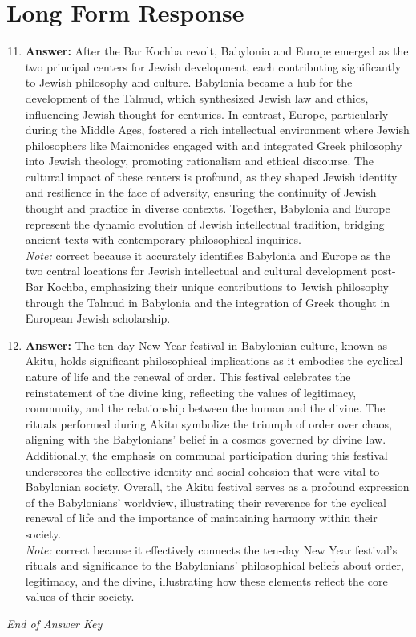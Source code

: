 \documentclass[12pt]{article}
\begin{document}
\section*{Long Form Response}
\begin{enumerate}[label=\arabic*.]
\setcounter{enumi}{10}
\item \textbf{Answer:} After the Bar Kochba revolt, Babylonia and Europe emerged as the two principal centers for Jewish development, each contributing significantly to Jewish philosophy and culture. Babylonia became a hub for the development of the Talmud, which synthesized Jewish law and ethics, influencing Jewish thought for centuries. In contrast, Europe, particularly during the Middle Ages, fostered a rich intellectual environment where Jewish philosophers like Maimonides engaged with and integrated Greek philosophy into Jewish theology, promoting rationalism and ethical discourse. The cultural impact of these centers is profound, as they shaped Jewish identity and resilience in the face of adversity, ensuring the continuity of Jewish thought and practice in diverse contexts. Together, Babylonia and Europe represent the dynamic evolution of Jewish intellectual tradition, bridging ancient texts with contemporary philosophical inquiries.
\\ \textit{Note:} correct because it accurately identifies Babylonia and Europe as the two central locations for Jewish intellectual and cultural development post-Bar Kochba, emphasizing their unique contributions to Jewish philosophy through the Talmud in Babylonia and the integration of Greek thought in European Jewish scholarship.
\item \textbf{Answer:} The ten-day New Year festival in Babylonian culture, known as Akitu, holds significant philosophical implications as it embodies the cyclical nature of life and the renewal of order. This festival celebrates the reinstatement of the divine king, reflecting the values of legitimacy, community, and the relationship between the human and the divine. The rituals performed during Akitu symbolize the triumph of order over chaos, aligning with the Babylonians' belief in a cosmos governed by divine law. Additionally, the emphasis on communal participation during this festival underscores the collective identity and social cohesion that were vital to Babylonian society. Overall, the Akitu festival serves as a profound expression of the Babylonians' worldview, illustrating their reverence for the cyclical renewal of life and the importance of maintaining harmony within their society.
\\ \textit{Note:} correct because it effectively connects the ten-day New Year festival's rituals and significance to the Babylonians' philosophical beliefs about order, legitimacy, and the divine, illustrating how these elements reflect the core values of their society.
\end{enumerate}

\vfill
\noindent\textit{End of Answer Key}
\end{document}
